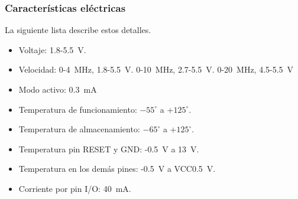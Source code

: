\subsubsection*{Características eléctricas}
La siguiente lista describe estos detalles.
\begin{itemize}
\item Voltaje: 1.8-\SI{5.5}{\volt}.
\item Velocidad: 0-\SI{4}{\mega\Hz},  1.8-\SI{5.5}{\volt}. 0-\SI{10}{\mega\Hz},  2.7-\SI{5.5}{\volt}. 0-\SI{20}{\mega\Hz},  4.5-\SI{5.5}{\volt}
\item Modo activo: \SI{0.3}{\mA}
\item Temperatura de funcionamiento: $-55^\circ$ a +$125^\circ$.
\item Temperatura de almacenamiento: $-65^\circ$ a +$125^\circ$.
\item Temperatura pin RESET y GND: -\SI{0.5}{\volt} a \SI{13}{\volt}.
\item Temperatura en los demás pines: -\SI{0.5}{\volt} a VCC\SI{0.5}{\volt}.
\item Corriente por pin I/O: \SI{40}{\mA}.

\end{itemize}

